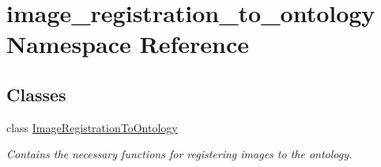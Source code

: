 \hypertarget{namespaceimage__registration__to__ontology}{\section{image\-\_\-registration\-\_\-to\-\_\-ontology Namespace Reference}
\label{namespaceimage__registration__to__ontology}
}
\subsection*{Classes}
\begin{DoxyCompactItemize}
\item 
class \hyperlink{classimage__registration__to__ontology_1_1ImageRegistrationToOntology}{Image\-Registration\-To\-Ontology}
\begin{DoxyCompactList}\small\item\em Contains the necessary functions for registering images to the ontology. \end{DoxyCompactList}\end{DoxyCompactItemize}
